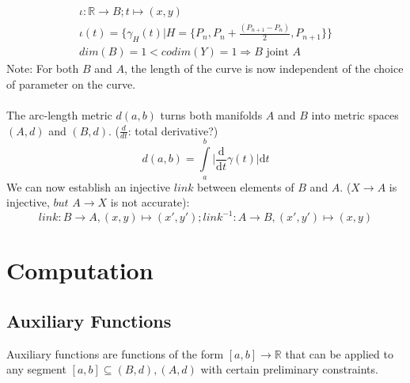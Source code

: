 \documentclass{article}
\begin{document}
\begin{align}
\iota: \mathbb{R} \rightarrow B; t \mapsto (x,y)\\
\iota(t) = \{ \gamma_{H}(t)\lvert H=\{P_{n},P_{n}+\frac{(P_{n+1}-P_{n})}{2},P_{n+1}\}\}\\
dim(B)=1<codim(Y)=1 \Rightarrow B \text{ joint } A
\end{align}
Note: For both $B$ and $A$, the length of the curve is now independent of the choice of parameter on the curve. ~\cite[]{Taimanov}\\\\
The arc-length metric $d(a,b)$ turns both manifolds $A$ and $B$ into metric spaces $(A,d)$ and $(B,d)$. ($\frac{d}{dt}$: total derivative?)
\begin{equation}
d(a,b) = \int \limits _{a}^{b}\lvert \frac{\mathrm{d}}{\mathrm{d}t}\gamma(t)\rvert \mathrm{d}t
\end{equation}
We can now establish an injective $link$ between elements of $B$ and $A$. ($X \rightarrow A$ is injective, $but$ $A \rightarrow X$ is not accurate):
\begin{equation}
link: B \rightarrow A, (x,y) \mapsto (x',y'); link^{-1}: A \rightarrow B, (x',y') \mapsto (x,y)
\end{equation}
\section{Computation}

\subsection{Auxiliary Functions}

Auxiliary functions are functions of the form $[a,b] \rightarrow \mathbb{R}$ that can be applied to any segment $[a,b] \subseteq (B,d),(A,d)$ with certain preliminary constraints.
\end{document}
